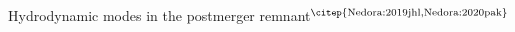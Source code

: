 \begin{frame}{Hydrodynamic modes in the postmerger remnant$^\text{\citep{Nedora:2019jhl,Nedora:2020pak}}$}





%
%

\end{frame}







